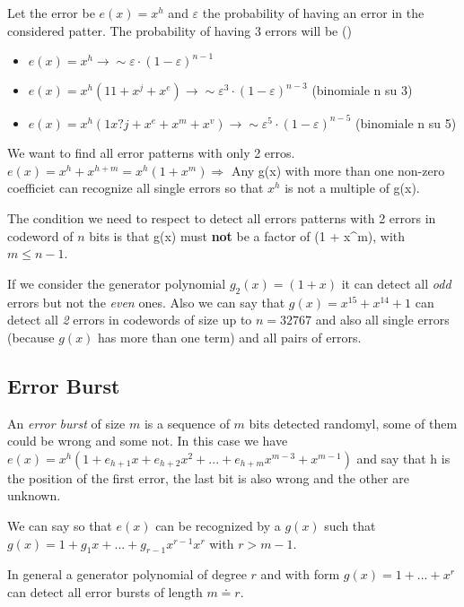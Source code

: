 Let the error be $e(x) = x^h$ and $\varepsilon$ the probability of having an error in the considered patter.
The probability of having 3 errors will be ()
\begin{itemize}
\item $e(x) = x^h \rightarrow \sim \varepsilon\cdot(1-\varepsilon)^{n-1}$
\item $e(x) = x^h(11 + x^j + x^e) \rightarrow \sim \varepsilon^3\cdot(1-\varepsilon)^{n-3}$ (binomiale n su 3)
\item $e(x) = x^h(1  x?j + x^e + x^m + x^v)  \rightarrow \sim \varepsilon^5\cdot(1-\varepsilon)^{n-5}$ (binomiale n su 5)
\end{itemize}  

We want to find all error patterns with only 2 erros. 
$e(x) = x^h + x^{h+m} = x^h(1+x^m) \Rightarrow$
Any g(x) with more than one non-zero coefficiet can recognize all single errors so that $x^h$ is not a multiple of g(x).

The condition we need to respect to detect all errors patterns with 2 errors in  codeword of $n$ bits is that g(x) must \textbf{not} be a factor of (1 + x^{m}), with $m \leq n - 1$.

If we consider the generator polynomial $g_2(x) = (1 + x)$ it can detect all \emph{odd} errors but not the \emph{even} ones. Also we can say that $g(x) = x^15 + x^14 + 1$ can detect all \emph{2} errors in codewords of size up to $n = 32767$ and also all single errors (because $g(x)$ has more than one term) and all pairs of errors. 

\subsection{Error Burst}
An \emph{error burst} of size $m$ is a sequence of $m$ bits detected randomyl, some of them could be wrong and some not. 
In this case we have $e(x) = x^h(1 + e_{h+1}x + e_{h+2}x^2 + ... + e_{h+m}x^{m-3} + x^{m-1})$ and say that h is the position of the first error, the last bit is also wrong and the other are unknown.

We can say so that $e(x)$ can be recognized by a $g(x)$ such that $g(x) = 1 + g_1x + ... + g_{r-1}x^{r-1} x^r$ with $r > m-1$.

In general a generator polynomial of degree $r$ and with form $g(x) = 1 + ... + x^r$ can detect all error bursts of length $m \doteq r$.

